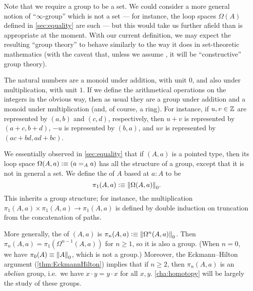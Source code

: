 \begin{rmk}
Note that we require a group to be a set.
We could consider a more general notion of ``$\infty$-group''%
which is not a set --- for instance, the loop spaces $\Omega(A)$ defined in \autoref{sec:equality} are such --- but this would take us further afield than is appropriate at the moment.
With our current definition, we may expect the resulting ``group theory'' to behave similarly to the way it does in set-theoretic mathematics (with the caveat that, unless we assume \LEM{}, it will be ``constructive'' group theory).
\end{rmk}

\begin{eg}
  The natural numbers \N are a monoid under addition, with unit $0$, and also under multiplication, with unit $1$.
  If we define the arithmetical operations on the integers \Z in the obvious way, then as usual they are a group under addition and a monoid under multiplication (and, of course, a ring).
  For instance, if $u, v \in \Z$ are represented by $(a,b)$ and $(c,d)$, respectively, then $u + v$ is represented by $(a + c, b + d)$, $-u$ is represented by $(b, a)$, and $u v$ is represented by $(a c + b d, a d + b c)$.
\end{eg}

\begin{eg}\label{thm:homotopy-groups}
  We essentially observed in \autoref{sec:equality} that if $(A,a)$ is a pointed type, then its loop space $\Omega(A,a)\defeq (\id[A]aa)$ has all the structure of a group, except that it is not in general a set.
  We define the 
  of $A$ based at $a:A$ to be
  \[\pi_1(A,a)\defeq \trunc0{\Omega(A,a)}.\]
  This inherits a group structure; for instance, the multiplication $\pi_1(A,a) \times \pi_1(A,a) \to \pi_1(A,a)$ is defined by double induction on truncation from the concatenation of paths.

  More generally, the 
  of $(A,a)$ is $\pi_n(A,a)\defeq \trunc0{\Omega^n(A,a)}$.
  Then $\pi_n(A,a) = \pi_1(\Omega^{n-1}(A,a))$ for $n\ge 1$, so it is also a group.
  (When $n=0$, we have $\pi_0(A) \jdeq \trunc0 A$, which is not a group.)
  Moreover, the Eckmann--Hilton argument (\autoref{thm:EckmannHilton}) implies that if $n\ge 2$, then $\pi_n(A,a)$ is an \emph{abelian} group, i.e.\ we have $x\cdot y = y\cdot x$ for all $x,y$.
  \autoref{cha:homotopy} will be largely the study of these groups.
\end{eg}


